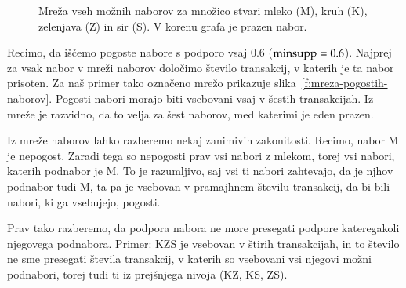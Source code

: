 \begin{figure}[htbp]
\caption{Mreža vseh možnih naborov za množico stvari mleko (M), kruh (K), zelenjava (Z) in sir (S). V korenu grafa je prazen nabor.}
\label{f:mreza-naborov}
\end{figure}

Recimo, da iščemo pogoste nabore s podporo vsaj 0.6 (${\rm minsupp}=0.6$). Najprej za vsak nabor v mreži naborov določimo število transakcij, v katerih je ta nabor prisoten. Za naš primer tako označeno mrežo prikazuje slika~\ref{f:mreza-pogostih-naborov}. Pogosti nabori morajo biti vsebovani vsaj v šestih transakcijah. Iz mreže je razvidno, da to velja za šest naborov, med katerimi je eden prazen.

Iz mreže naborov lahko razberemo nekaj zanimivih zakonitosti. Recimo, nabor M je nepogost. Zaradi tega so nepogosti prav vsi nabori z mlekom, torej vsi nabori, katerih podnabor je M. To je razumljivo, saj vsi ti nabori zahtevajo, da je njhov podnabor tudi M, ta pa je vsebovan v pramajhnem številu transakcij, da bi bili nabori, ki ga vsebujejo, pogosti.

Prav tako razberemo, da podpora nabora ne more presegati podpore kateregakoli njegovega podnabora. Primer: KZS je vsebovan v štirih transakcijah, in to število ne sme presegati števila transakcij, v katerih so vsebovani vsi njegovi možni podnabori, torej tudi ti iz prejšnjega nivoja (KZ, KS, ZS).

